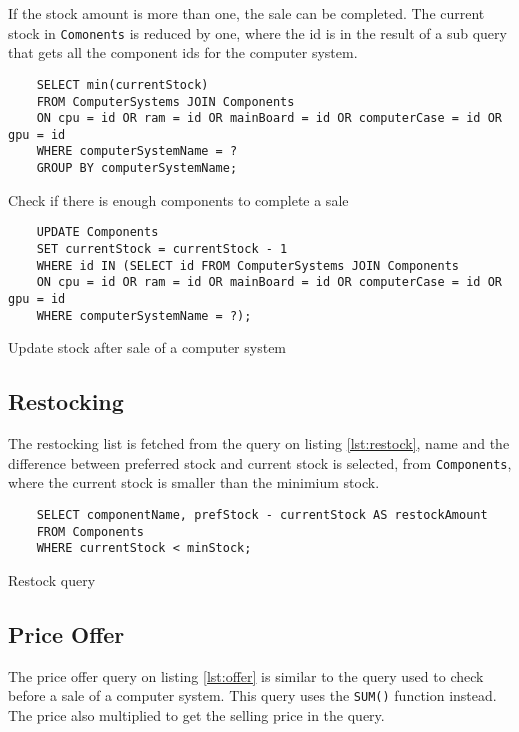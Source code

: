 \documentclass[12pt,a4paper]{article}
\begin{document}
If the stock amount is more than one, the sale can be completed. 
The current stock in \texttt{Comonents} is reduced by one, where the id is in the result of a sub query that gets all the component ids for the computer system.

\begin{listing}[!htbp]
    \begin{verbatim}
    SELECT min(currentStock)
    FROM ComputerSystems JOIN Components 
    ON cpu = id OR ram = id OR mainBoard = id OR computerCase = id OR gpu = id
    WHERE computerSystemName = ?
    GROUP BY computerSystemName;
    \end{verbatim}
    \caption{Check if there is enough components to complete a sale}
    \label{lst:salequery}
\end{listing}

\begin{listing}[!htbp]
	\begin{verbatim}
    UPDATE Components
    SET currentStock = currentStock - 1
    WHERE id IN (SELECT id FROM ComputerSystems JOIN Components
    ON cpu = id OR ram = id OR mainBoard = id OR computerCase = id OR gpu = id
    WHERE computerSystemName = ?);
	\end{verbatim}
	\caption{Update stock after sale of a computer system}
\label{lst:saleupdate}
\end{listing}

\subsection{Restocking}

The restocking list is fetched from the query on listing  \ref{lst:restock}, name and the difference between preferred stock and current stock is selected, from \texttt{Components}, where the current stock is smaller than the minimium stock.

\begin{listing}[!htbp]
	\begin{verbatim}
    SELECT componentName, prefStock - currentStock AS restockAmount
    FROM Components
    WHERE currentStock < minStock;
	\end{verbatim}
	\caption{Restock query}
    \label{lst:restock}
\end{listing}

\subsection{Price Offer}
The price offer query on listing \ref{lst:offer} is similar to the query used to check before a sale of a computer system. This query uses the \texttt{SUM()} function instead. 
The price also multiplied to get the selling price in the query.
\end{document}
